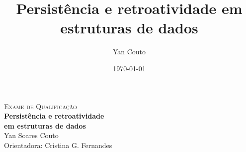 \documentclass[11pt,oneside,a4paper, openany]{book}
\title{Persistência e retroatividade em estruturas de dados}
\author{Yan Couto}
\date{\today}
\begin{document}
\mainmatter

\begin{center}
	\textsc{Exame de Qualificação} \\[2ex]
	\textbf{\huge{Persistência e retroatividade\\ em estruturas de dados}}\\[2ex]

	\Large{Yan Soares Couto} \\[2ex]

	Orientadora: Cristina G. Fernandes\\[5ex]
\end{center}














\end{document}

